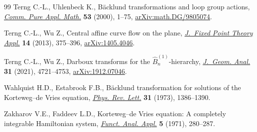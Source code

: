\documentclass[10pt,a4paper]{amsart}
\numberwithin{equation}{section}
\begin{document}
\begin{thebibliography}{99}
Terng C.-L., Uhlenbeck K., B\"acklund transformations and loop group actions,
  \href{https://doi.org/10.1002/(SICI)1097-0312(200001)53:1<1::AID-CPA1>3.3.CO;2-L}{\textit{Comm. Pure Appl. Math.}} \textbf{53} (2000), 1--75,
  \href{https://arxiv.org/abs/math.DG/9805074}{arXiv:math.DG/9805074}.

Terng C.-L., Wu Z., Central affine curve flow on the plane, \href{https://doi.org/10.1007/s11784-014-0161-8}{\textit{J.~Fixed
  Point Theory Appl.}} \textbf{14} (2013), 375--396, \href{https://arxiv.org/abs/1405.4046}{arXiv:1405.4046}.

Terng C.-L., Wu Z., Darboux transforms for the {$\hat B_n^{(1)}$}-hierarchy,
  \href{https://doi.org/10.1007/s12220-020-00454-7}{\textit{J.~Geom. Anal.}} \textbf{31} (2021), 4721--4753, \href{https://arxiv.org/abs/1912.07046}{arXiv:1912.07046}.

Wahlquist H.D., Estabrook F.B., B\"acklund transformation for solutions of the
  {K}orteweg--de {V}ries equation, \href{https://doi.org/10.1103/PhysRevLett.31.1386}{\textit{Phys. Rev. Lett.}} \textbf{31}
  (1973), 1386--1390.

Zakharov V.E., Faddeev L.D., Korteweg--de {V}ries equation: {A} completely
  integrable {H}amiltonian system, \href{https://doi.org/10.1007/BF01086739}{\textit{Funct. Anal. Appl.}} \textbf{5}
  (1971), 280--287.

\end{thebibliography}
\end{document}
